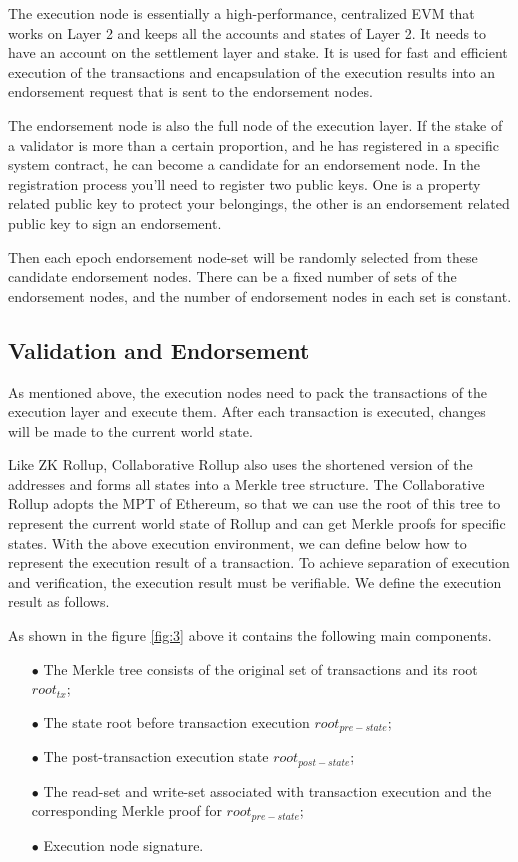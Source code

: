 \documentclass{iacrtrans}
\begin{document}
The execution node is essentially a high-performance, centralized EVM that works on Layer 2 and keeps all the accounts and states of Layer 2. It needs to have an account on the settlement layer and stake. It is used for fast and efficient execution of the transactions and encapsulation of the execution results into an endorsement request that is sent to the endorsement nodes.

The endorsement node is also the full node of the execution layer. If the stake of a validator is more than a certain proportion, and he has registered in a specific system contract, he can become a candidate for an endorsement node. In the registration process you'll need to register two public keys. One is a property related public key to protect your belongings, the other is an endorsement related public key to sign an endorsement.

Then each epoch endorsement node-set will be randomly selected from these candidate endorsement nodes. There can be a fixed number of sets of the endorsement nodes, and the number of endorsement nodes in each set is constant.


\subsection{Validation and Endorsement}
As mentioned above, the execution nodes need to pack the transactions of the execution layer and execute them. After each transaction is executed, changes will be made to the current world state.

Like ZK Rollup, Collaborative Rollup also uses the shortened version of the addresses and forms all states into a Merkle tree structure. The Collaborative Rollup adopts the MPT of Ethereum, so that we can use the root of this tree to represent the current world state of Rollup and can get Merkle proofs for specific states.
With the above execution environment, we can define below how to represent the execution result of a transaction. To achieve separation of execution and verification, the execution result must be verifiable. We define the execution result as follows.

As shown in the figure \ref{fig:3} above it contains the following main components.
\begin{itemize}	
	\item[$\bullet$] The Merkle tree consists of the original set of transactions and its root $root_{tx}$;
	\item[$\bullet$] The state root before transaction execution $root_{pre-state}$;
	\item[$\bullet$] The post-transaction execution state $root_{post-state}$;
	\item[$\bullet$] The read-set and write-set associated with transaction execution and the corresponding Merkle proof for $root_{pre-state}$;
	\item[$\bullet$] Execution node signature.
\end{itemize}
\end{document}

